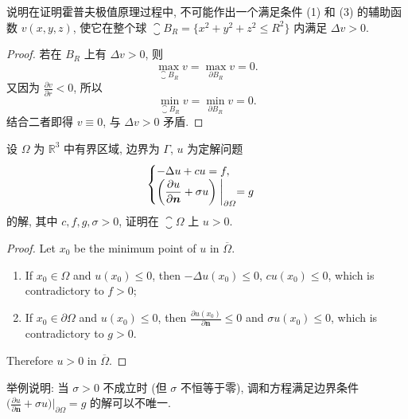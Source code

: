 \begin{exercise}
  说明在证明霍普夫极值原理过程中, 不可能作出一个满足条件 (1) 和 (3) 的辅助函数 $v(x,y,z)$,
  使它在整个球 $\closure{B}_R = \{x^2+y^2+z^2 \leq R^2\}$ 内满足 $\Delta v>0$.
\end{exercise}

\begin{proof}
  若在 $B_R$ 上有 $\Delta v>0$, 则
  \[\max_{\closure{B}_R} v = \max_{\partial B_R} v = 0.\]
  又因为 $\frac{\partial v}{\partial r} < 0$, 所以
  \[\min_{\closure{B}_R} v = \min_{\partial B_R} v = 0.\]
  结合二者即得 $v\equiv 0$, 与 $\Delta v>0$ 矛盾.
\end{proof}


\begin{exercise}
  设 $\varOmega$ 为 $\mathbb{R}^3$ 中有界区域, 边界为 $\varGamma$, $u$ 为定解问题
  \[\begin{cases}
    - \Delta u + cu = f, \\
    \displaystyle\biggl(\frac{\partial u}{\partial \bm{n}} + \sigma u\biggr)\biggm|_{\partial\varOmega} = g
  \end{cases}\]
  的解, 其中 $c,f,g,\sigma>0$, 证明在 $\closure{\varOmega}$ 上 $u>0$.
\end{exercise}

\begin{proof}
  Let $x_0$ be the minimum point of $u$ in $\overline{\varOmega}$.
  \begin{enumerate}[(1)]
    \item If $x_0\in\varOmega$ and $u(x_0)\leq 0$, then $-\Delta u(x_0)\leq 0$, $cu(x_0)\leq 0$,
      which is contradictory to $f>0$;
    \item If $x_0\in\partial\varOmega$ and $u(x_0)\leq 0$,
      then $\frac{\partial u(x_0)}{\partial\bm{n}}\leq 0$ and $\sigma u(x_0)\leq 0$,
      which is contradictory to $g>0$.
  \end{enumerate}
  Therefore $u>0$ in $\overline{\varOmega}$.
\end{proof}


\begin{exercise}
  举例说明: 当 $\sigma>0$ 不成立时 (但 $\sigma$ 不恒等于零), 调和方程满足边界条件
  $\displaystyle\bigl(\frac{\partial u}{\partial\bm{n}}+\sigma u\bigr)\big|_{\partial\varOmega}=g$
  的解可以不唯一.
\end{exercise}

